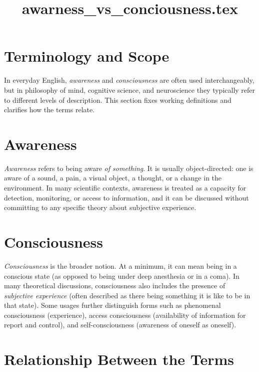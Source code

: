 \documentclass[a4paper]{article}
\title{awarness_vs_conciousness.tex}
\date{}
\begin{document}
    \maketitle
    
    
    \section{Terminology and Scope}
        
        In everyday English, \emph{awareness} and \emph{consciousness} are often used interchangeably, but in philosophy of mind, cognitive science, and neuroscience they typically refer to different levels of description. This section fixes working definitions and clarifies how the terms relate.
    
    
    \section{Awareness}
        
        \emph{Awareness} refers to being aware \emph{of something}. It is usually object-directed: one is aware of a sound, a pain, a visual object, a thought, or a change in the environment. In many scientific contexts, awareness is treated as a capacity for detection, monitoring, or access to information, and it can be discussed without committing to any specific theory about subjective experience.
    
    
    \section{Consciousness}
        
        \emph{Consciousness} is the broader notion. At a minimum, it can mean being in a conscious state (as opposed to being under deep anesthesia or in a coma). In many theoretical discussions, consciousness also includes the presence of \emph{subjective experience} (often described as there being something it is like to be in that state). Some usages further distinguish forms such as phenomenal consciousness (experience), access consciousness (availability of information for report and control), and self-consciousness (awareness of oneself as oneself).
    
    
    \section{Relationship Between the Terms}
        
\end{document}
